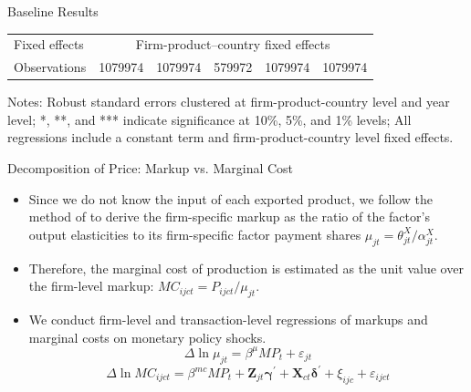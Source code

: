 \documentclass[10pt]{beamer}
\begin{document}
\begin{frame}{Baseline Results}
\begin{table}[htbp]
{\begin{threeparttable}
\begin{tabular}{lccccc}
                Fixed effects   &  \multicolumn{5}{c}{Firm-product–country fixed effects}\\   
                Observations    & 1079974 & 1079974 & 579972 & 1079974 & 1079974 \\
                \bottomrule
            \end{tabular}
            \begin{tablenotes}
                \footnotesize
                \item Notes: Robust standard errors clustered at firm-product-country level and year level;  *, **, and *** indicate significance at 10\%, 5\%, and 1\% levels; All regressions include a constant term and firm-product-country level fixed effects.
            \end{tablenotes}
        \end{threeparttable}
        }
	\label{tab.baseline}
    \end{table}
\end{frame}

\begin{frame}{Decomposition of Price: Markup vs. Marginal Cost}
    \begin{itemize}
        \item Since we do not know the input of each exported product, we follow the method of \cite{dlw2012} to derive the firm-specific markup as the ratio of the factor’s output elasticities to its firm-specific factor payment shares $\mu_{jt}=\theta_{jt}^{X}/\alpha_{jt}^{X}$.
        \item Therefore, the marginal cost of production is estimated as the unit value over the firm-level markup: $MC_{ijct}=P_{ijct}/\mu_{jt}$.
        \item We conduct firm-level and transaction-level regressions of markups and marginal costs on monetary policy shocks.
        \begin{equation}
            \Delta \ln \mu_{j t}=\beta^{\mu} M P_{t} + \varepsilon_{jt}
    	\label{eq.markup}
        \end{equation}
        \begin{equation}
            \Delta \ln MC_{ijct}=\beta^{mc} M P_{t} + \mathbf{Z}_{jt} \boldsymbol{\gamma}^{\prime}+\mathbf{X}_{ct} \boldsymbol{\delta}^{\prime} +\xi_{i j c} + \varepsilon_{ijct}
    	\label{eq.mc}
        \end{equation}
    \end{itemize}
\end{frame}
\end{document}
